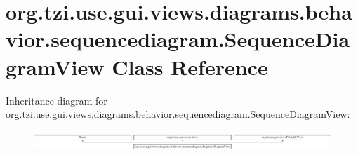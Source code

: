 \hypertarget{classorg_1_1tzi_1_1use_1_1gui_1_1views_1_1diagrams_1_1behavior_1_1sequencediagram_1_1_sequence_diagram_view}{\section{org.\-tzi.\-use.\-gui.\-views.\-diagrams.\-behavior.\-sequencediagram.\-Sequence\-Diagram\-View Class Reference}
\label{classorg_1_1tzi_1_1use_1_1gui_1_1views_1_1diagrams_1_1behavior_1_1sequencediagram_1_1_sequence_diagram_view}
}
Inheritance diagram for org.\-tzi.\-use.\-gui.\-views.\-diagrams.\-behavior.\-sequencediagram.\-Sequence\-Diagram\-View\-:\begin{figure}[H]
\begin{center}
\leavevmode
\includegraphics[height=0.772947cm]{classorg_1_1tzi_1_1use_1_1gui_1_1views_1_1diagrams_1_1behavior_1_1sequencediagram_1_1_sequence_diagram_view}
\end{center}
\end{figure}
